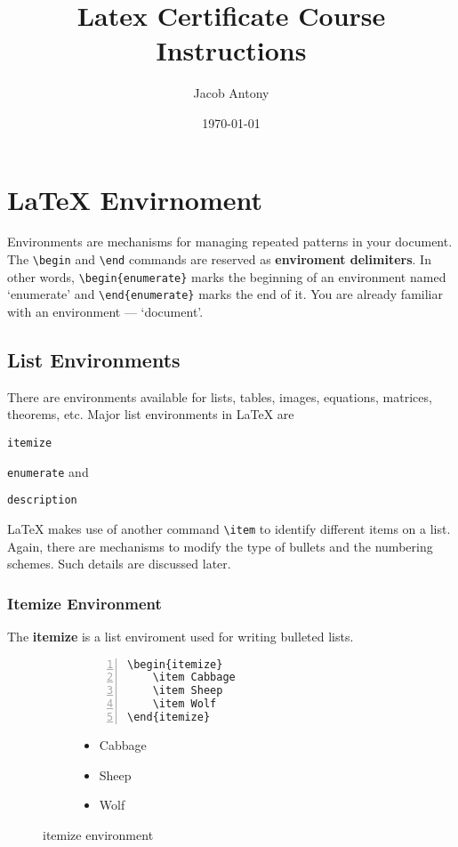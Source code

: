 \documentclass{article}
\title{Latex Certificate Course Instructions}
\author{Jacob Antony}
\date{\today}
\begin{document}
\maketitle

\section{\LaTeX{} Envirnoment}
Environments are mechanisms for managing repeated patterns in your document. The \texttt{\textbackslash begin} and \texttt{\textbackslash end} commands are reserved as \textbf{enviroment delimiters}. In other words, \texttt{\textbackslash begin\{enumerate\}} marks the beginning of an environment named `enumerate' and \texttt{\textbackslash end\{enumerate\}} marks the end of it. You are already familiar with an environment --- `document'.

\subsection{List Environments}
There are environments available for lists, tables, images, equations, matrices, theorems, etc. Major list environments in \LaTeX{} are
\begin{enumerate*}
	\item \texttt{itemize}
	\item \texttt{enumerate} and
	\item \texttt{description}
\end{enumerate*}

 \LaTeX{} makes use of another command \texttt{\textbackslash item} to identify different items on a list. Again, there are mechanisms to modify the type of bullets and the numbering schemes. Such details are discussed later.

\subsubsection{Itemize Environment}
The \textbf{itemize} is a list enviroment used for writing bulleted lists.
\begin{figure}[h]
\centering
\begin{subfigure}{0.45\textwidth}
\begin{Verbatim}[numbers = left]
\begin{itemize}
	\item Cabbage
	\item Sheep
	\item Wolf
\end{itemize}
\end{Verbatim}
\end{subfigure}
\begin{subfigure}{0.45\textwidth}
\begin{itemize}
	\item Cabbage
	\item Sheep
	\item Wolf
\end{itemize}
\end{subfigure}
\caption{itemize environment}
\end{figure}
\end{document}
